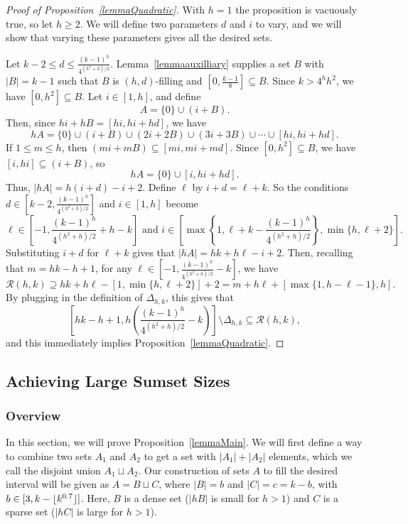 \documentclass{daj}
\theoremstyle{definition}
\theoremstyle{remark}
\numberwithin{equation}{section}
\numberwithin{theorem}{section}
\newcommand{\calr}{\mathcal{R}}
\DeclarePairedDelimiter{\floor}{\lfloor}{\rfloor}
\begin{document}
\begin{proof}[Proof of Proposition~\ref{lemmaQuadratic}]
With $h=1$ the proposition is vacuously true, so let $h \geq 2$. We will define two parameters $d$ and $i$ to vary, and we will show that varying these parameters gives all the desired sets. 

Let $k-2 \leq d \leq \frac{(k-1)^h}{4^{(h^2+h)/2}}$. Lemma~\ref{lemmaauxilliary} supplies a set $B$ with $|B| = k-1$ such that $B$ is $(h,d)$-filling and $[0,\frac{k-1}{8}] \subseteq B$. 
Since $k>4^hh^2$, we have $[0,h^2] \subseteq B$. Let $i \in [1,h]$, and define \[A = \{0\} \cup (i+B).\] Then, since $hi + hB = [hi,hi+hd]$, we have \[hA = \{0\} \cup (i +B) \cup (2i+2B) \cup (3i + 3B)  \cup \cdots \cup [hi,hi+hd].\] If $1 \leq m \leq h$, then $(mi + mB) \subseteq [mi,mi + md]$. Since $[0,h^2]\subseteq B$, we have $[i,hi] \subseteq (i + B)$, so \[hA = \{0\} \cup [i,hi+hd].\]
Thus, $|hA| = h(i+d)-i+2$. Define $\ell$ by $i+d = \ell+k$. So the conditions $d \in \left[k-2,\frac{(k-1)^h}{4^{(h^2+h)/2}}\right]$ and $i \in [1,h]$ become \[\ell \in \left[-1,\frac{(k-1)^h}{4^{(h^2+h)/2}}+h-k\right] \text{ and } i \in \left[\max\left\{1,\ell+k-\frac{(k-1)^h}{4^{(h^2+h)/2}}\right\}, \min\{h,\ell +2\}\right].\] 
Substituting $i+d$ for $\ell + k$ gives that $|hA| = hk + h\ell -i+2$. Then, recalling that $m = hk-h+1$, for any $\ell \in \left[-1,\frac{(k-1)^h}{4^{(h^2+h)/2}}-k\right]$, we have \[\calr(h,k) \supseteq hk+h\ell-[1,\min\{h,\ell +2\}]+2 = 
m + h\ell + [\max\{1,h-\ell-1\},h].\] By plugging in the definition of $\Delta_{h,k}$, this gives that \[\left[hk-h+1,h\left(\frac{(k-1)^h}{4^{(h^2+h)/2}}-k\right)\right]\setminus \Delta_{h,k} \subseteq \calr(h,k),\] and this immediately implies Proposition~\ref{lemmaQuadratic}.
\end{proof}


\subsection{Achieving Large Sumset Sizes}\label{sectlemmamain}

\subsubsection{Overview}
In this section, we will prove Proposition~\ref{lemmaMain}. We will first define a way to combine two sets $A_1$ and $A_2$ to get a set with $|A_1| + |A_2|$ elements, which we call the disjoint union $A_1 \sqcup A_2$. Our construction of sets $A$ to fill the desired interval will be given as $A = B \sqcup C$, where $|B| = b$ and $|C| = c = k-b$, with $b \in [3,k-\floor{k^{0.7}}]$. Here, $B$ is a dense set ($|hB|$ is small for $h>1$) and $C$ is a sparse set ($|hC|$ is large for $h>1$). 
\end{document}
